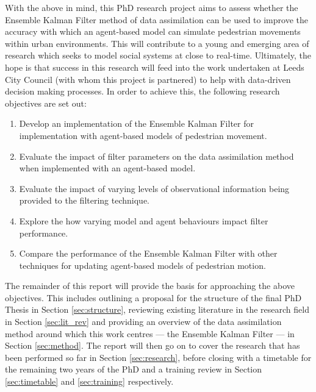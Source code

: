 With the above in mind, this PhD research project aims to assess whether the
Ensemble Kalman Filter method of data assimilation can be used to improve the
accuracy with which an agent-based model can simulate pedestrian movements
within urban environments.
This will contribute to a young and emerging area of research which seeks to
model social systems at close to real-time.
Ultimately, the hope is that success in this research will feed into the work
undertaken at Leeds City Council (with whom this project is partnered) to help
with data-driven decision making processes.
In order to achieve this, the following research objectives are set out:
\begin{enumerate}
    \item Develop an implementation of the Ensemble Kalman Filter for
        implementation with agent-based models of pedestrian movement.
    \item Evaluate the impact of filter parameters on the data assimilation
        method when implemented with an agent-based model.
    \item Evaluate the impact of varying levels of observational information
        being provided to the filtering technique.
    \item Explore the how varying model and agent behaviours impact filter
        performance.
    \item Compare the performance of the Ensemble Kalman Filter with other
        techniques for updating agent-based models of pedestrian motion.
\end{enumerate}

The remainder of this report will provide the basis for approaching the above
objectives.
This includes outlining a proposal for the structure of the final PhD Thesis in
Section \ref{sec:structure}, reviewing existing literature in the research field
in Section \ref{sec:lit_rev} and providing an overview of the data assimilation
method around which this work centres --- the Ensemble Kalman Filter --- in
Section \ref{sec:method}.
The report will then go on to cover the research that has been performed so far
in Section \ref{sec:research}, before closing with a timetable for the remaining
two years of the PhD and a training review in Section \ref{sec:timetable} and
\ref{sec:training} respectively.



